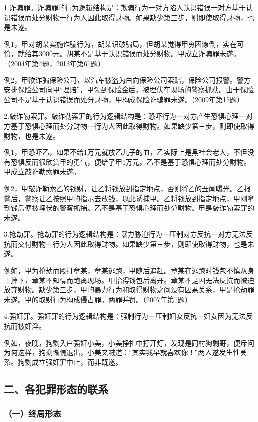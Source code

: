 1.诈骗罪。诈骗罪的行为逻辑结构是：欺骗行为一对方陷人认识错误一对方基于认识错误而处分财物一行为人因此取得财物。如果缺少第三步，则即使取得财物，也是未遂。

例1，甲对胡某实施诈骗行为，胡某识破骗局，但胡某觉得甲穷困潦倒，实在可怜，就给其3000元。胡某不是基于认识错误而处分财物。甲成立诈骗罪未遂。（2004年第4题，2013年第61题）

例2，甲欲诈骗保险公司，以汽车被盗为由向保险公司索赔，保险公司报警。警方安排保险公司向甲“理赔”，甲领到保险金后，被埋伏在现场的警察抓获。由于保险公司不是基于认识错误而处分财物，甲构成保险诈骗罪未遂。（2009年第15题）

2.敲诈勒索罪。敲诈勒索罪的行为逻辑结构是：恐吓行为一对方产生恐惧心理一对方基于恐惧心理而处分财物一行为人因此取得财物。如果缺少第三步，则即使取得财物，也是未遂。

例1，甲恐吓乙，如果不给1万元就放乙儿子的血，乙实际上是黑社会老大，不但没有恐惧反而很欣赏甲的勇气，便给了甲1万元。乙不是基于恐惧心理而处分财物。甲成立敲诈勒索罪未遂。

例2，甲敲诈勒索乙的钱财，让乙将钱放到指定地点，否则将乙的丑闻曝光。乙报警后，警察让乙按照甲的指示去放钱，以此诱捕甲。乙将钱放到指定地点，甲刚拿到钱后便被埋伏的警察抓捕。乙不是基于恐惧心理而处分财物。甲是敲诈勒索罪的未遂。

3.抢劫罪。抢劫罪的行为逻辑结构是：暴力胁迫行为一压制对方反抗一对方无法反抗而交付财物一行为人因此取得财物。如果缺少第三步，则即使取得财物，也是未遂。

例如，甲为抢劫而殴打章某，章某逃跑，甲随后追赶。章某在逃跑时钱包不慎从身上掉下，章某不知情而跑离现场。甲拾得钱包后离开。章某不是因无法反抗而被迫放弃财物。缺少第三步，甲的暴力行为和取得财物之间没有因果关系，甲是抢劫罪未遂。甲的取财行为构成侵占罪。两罪并罚。（2007年第1题）

4.强奸罪。强奸罪的行为逻辑结构是：强制行为一压制妇女反抗一妇女因为无法反抗而被奸淫。

例如，夜晚，狗剩入户强奸小美，小美挣扎中打开灯，发现是同村狗剩哥，便斥问为何这样，狗剩惭愧退出，小美又喊道：“其实我早就喜欢你！”两人遂发生性关系。狗剩成立强奸罪中止，而非既遂。

\subsection*{二、各犯罪形态的联系}

\subsubsection*{（一）终局形态}

